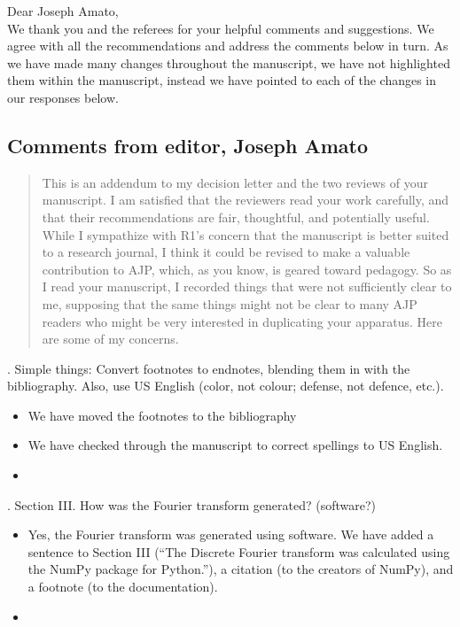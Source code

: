 \documentclass{article}
\begin{document}
\noindent Dear Joseph Amato, \\

\noindent We thank you and the referees for your helpful comments and suggestions. 
We agree with all the recommendations and address the comments below in turn. 
As we have made many changes throughout the manuscript, we have not highlighted them within the manuscript, instead we have pointed to each of the changes in our responses below. 

\subsection*{Comments from editor, Joseph Amato}
\begin{quote}
This is an addendum to my decision letter and the two reviews of your manuscript.  I am satisfied that the reviewers read your work carefully, and that their recommendations are fair, thoughtful, and potentially useful.  While I sympathize with R1’s concern that the manuscript is better suited to a research journal, I think it could be revised to make a valuable contribution to AJP, which, as you know, is geared toward pedagogy.  So as I read your manuscript, I recorded things that were not sufficiently clear to me, supposing that the same things might not be clear to many AJP readers who might be very interested in duplicating your apparatus.  Here are some of my concerns.
\end{quote}

. Simple things: Convert footnotes to endnotes, blending them in with the bibliography.  Also, use US English (color, not colour; defense, not defence, etc.). 
\begin{itemize}
\item We have moved the footnotes to the bibliography
\item We have checked through the manuscript to correct spellings to US English. 
\item[]
\end{itemize}

. Section III.  How was the Fourier transform generated?  (software?)
\begin{itemize}
\item Yes, the Fourier transform was generated using software. We have added a sentence to Section III (``The Discrete Fourier transform was calculated using the NumPy package for Python.''), a citation (to the creators of NumPy), and a footnote (to the documentation).
\item[]
\end{itemize}
\end{document}
